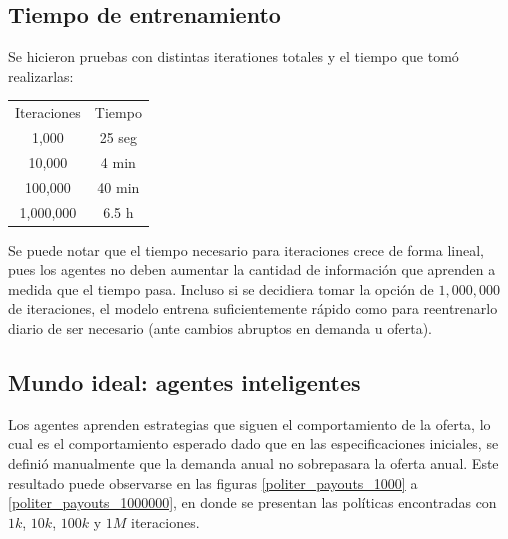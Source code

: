 \subsection{Tiempo de entrenamiento}

Se hicieron pruebas con distintas iterationes totales y el tiempo que tomó realizarlas:

\begin{center}
\begin{tabular}{c|c}
Iteraciones     &  Tiempo\\
1,000     &  25 seg\\
10,000     &  4 min\\
100,000     &  40 min\\
1,000,000     & 6.5 h
\end{tabular}
\end{center}

Se puede notar que el tiempo necesario para iteraciones crece de forma lineal, pues los agentes no deben aumentar la cantidad de informaci\'on que aprenden a medida que el tiempo pasa. Incluso si se decidiera tomar la opci\'on de $1,000,000$ de iteraciones, el modelo entrena suficientemente r\'apido como para reentrenarlo diario de ser necesario (ante cambios abruptos en demanda u oferta).

\subsection{Mundo ideal: agentes inteligentes}

Los agentes aprenden estrategias que siguen el comportamiento de la oferta, lo cual es el comportamiento esperado dado que en las especificaciones iniciales, se defini\'o manualmente que la demanda anual no sobrepasara la oferta anual. Este resultado puede observarse en las figuras \ref{politer_payouts_1000} a \ref{politer_payouts_1000000}, en donde se presentan las pol\'iticas encontradas con $1k$, $10k$, $100k$ y $1M$ iteraciones. \\

